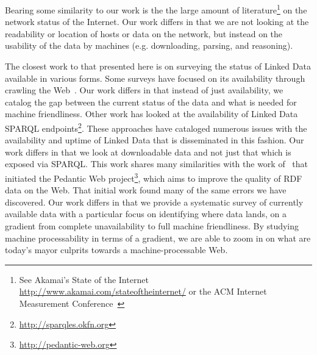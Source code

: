 Bearing some similarity to our work is the the large amount of
 literature\footnote{See Akamai's State of
   the Internet \url{http://www.akamai.com/stateoftheinternet/}
   or the ACM Internet Measurement Conference~\cite{Byers:2012:2398776}}
 on the network status of the Internet.
Our work differs in that we are not looking at the readability
 or location of hosts or data on the network, but instead on
 the usability of the data by machines
 (e.g. downloading, parsing, and reasoning).

The closest work to that presented here is on surveying the status of
 Linked Data available in various forms.
Some surveys have focused on its availability through
 crawling the Web~\cite{rdfa-deployment2013, linkedatadynamics2013}.
Our work differs in that instead of just availability,
 we catalog the gap between the current status of the data
 and what is needed for machine friendliness.
Other work has looked at the availability of
 Linked Data SPARQL endpoints\footnote{\url{http://sparqles.okfn.org}}\cite{sparqlready2013}.
These approaches have cataloged numerous issues with the availability
 and uptime of Linked Data that is disseminated in this fashion.
Our work differs in that we look at downloadable data
 and not just that which is exposed via SPARQL.
This work shares many similarities with
 the work of~\cite{conf/www/HoganHPDP10} that initiated
 the Pedantic Web project\footnote{\url{http://pedantic-web.org}},
 which aims to improve the quality of RDF data on the Web.
That initial work found many of the same errors we have discovered.
Our work differs in that we provide a systematic survey
 of currently available data with a particular focus on
 identifying where data lands, on a gradient from complete unavailability
 to full machine friendliness.
By studying machine processability in terms of a gradient,
 we are able to zoom in on what are today's mayor culprits
 towards a machine-processable Web.

